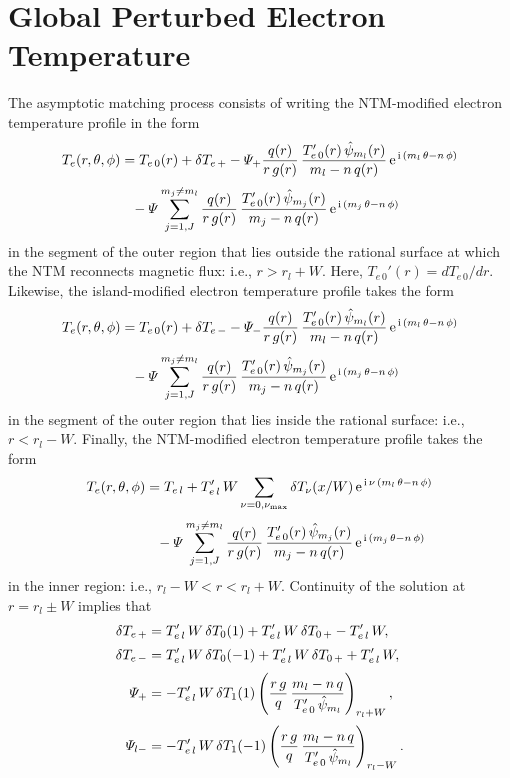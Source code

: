\documentclass[12pt,prb,aps]{revtex4-1}
\begin{document}
\section{Global Perturbed Electron Temperature}\label{s5}
The asymptotic matching process consists of writing the NTM-modified electron temperature profile in the form
\begin{align}
T_e(r,\theta,\phi)&= T_{e\,0}(r) +\delta T_{e\,+}-{\mit\Psi}_+\frac{q(r)}{r\,g(r)}\,\frac{T_{e\,0}'(r)\,\hat{\psi}_{m_l}(r)}{m_l-n\,q(r)}\,{\rm e}^{\,{\rm i}\,(m_l\,\theta-n\,\phi)}\nonumber\\[0.5ex]&\phantom{=}
-{\mit\Psi}\sum_{j=1,J}^{m_j\neq m_l} \frac{q(r)}{r\,g(r)}\,\frac{T_{e\,0}'(r)\,\hat{\psi}_{m_j}(r)}{m_j-n\,q(r)}\,{\rm e}^{\,{\rm i}\,(m_j\,\theta-n\,\phi)}
\end{align}
in the segment of the outer region that lies outside the rational surface at which the NTM reconnects magnetic flux: i.e., $r>r_l+W$. Here, $T_{e\,0}'(r) = dT_{e\,0}/dr$. Likewise, the
island-modified electron temperature profile takes the form
\begin{align}
T_e(r,\theta,\phi)&= T_{e\,0}(r) +\delta T_{e\,-}-{\mit\Psi}_-\frac{q(r)}{r\,g(r)}\,\frac{T_{e\,0}'(r)\,\hat{\psi}_{m_l}(r)}{m_l-n\,q(r)}\,{\rm e}^{\,{\rm i}\,(m_l\,\theta-n\,\phi)}\nonumber\\[0.5ex]&\phantom{=}
-{\mit\Psi}\sum_{j=1,J}^{m_j\neq m_l} \frac{q(r)}{r\,g(r)}\,\frac{T_{e\,0}'(r)\,\hat{\psi}_{m_j}(r)}{m_j-n\,q(r)}\,{\rm e}^{\,{\rm i}\,(m_j\,\theta-n\,\phi)}
\end{align}
in the segment of the outer region that lies inside the rational surface: i.e., $r<r_l-W$. Finally, the NTM-modified electron temperature profile 
takes the form
\begin{align}
T_e(r,\theta,\phi) &= T_{e\,l} + T_{e\,l}'\,W\sum_{\nu=0,\nu_{\rm max}}\delta T_\nu(x/W)\,{\rm e}^{\,{\rm i}\,\nu\,(m_l\,\theta-n\,\phi)}\nonumber\\[0.5ex]
&\phantom{=}
-{\mit\Psi}\sum_{j=1,J}^{m_j\neq m_l} \frac{q(r)}{r\,g(r)}\,\frac{T_{e\,0}'(r)\,\hat{\psi}_{m_j}(r)}{m_j-n\,q(r)}\,{\rm e}^{\,{\rm i}\,(m_j\,\theta-n\,\phi)}
\end{align}
in the inner region: i.e., $r_l-W<r<r_l+W$.  Continuity of the solution at $r=r_l\pm W$ implies that
\begin{align}
\delta T_{e\,+} &= T_{e\,l}'\,W\,\delta T_{0}(1)+T_{e\,l}'\,W\,\delta T_{0\,+} - T_{e\,l}'\,W,\\[0.5ex]
\delta T_{e\,-} &= T_{e\,l}'\,W\,\delta T_{0}(-1) +T_{e\,l}'\,W\,\delta T_{0\,+}+ T_{e\,l}'\,W,\\[0.5ex]
{\mit\Psi}_{+} &= - T_{e\,l}'\,W\,\delta T_1(1)\left(\frac{r\,g}{q}\,\frac{m_l-n\,q}{T_{e\,0}'\,\hat{\psi}_{m_l}}\right)_{r_l+W},\\[0.5ex]
{\mit\Psi}_{l-} &=- T_{e\,l}'\,W\,\delta T_1(-1)\left(\frac{r\,g}{q}\,\frac{m_l-n\,q}{T_{e\,0}'\,\hat{\psi}_{m_l}}
\right)_{r_l-W}.
\end{align}
\end{document}
